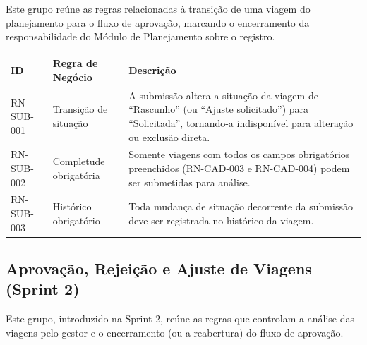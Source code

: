 \documentclass[12pt,article,oneside,a4paper]{abntex2}
\begin{document}
Este grupo reúne as regras relacionadas à transição de uma viagem do
planejamento para o fluxo de aprovação, marcando o encerramento da
responsabilidade do Módulo de Planejamento sobre o registro.

\begin{xltabular}{\textwidth}{|l|l|Y|}
\hline
{}
\textbf{ID} & \textbf{Regra de Negócio} & \textbf{Descrição} \\
\hline
\endhead
RN-SUB-001 & Transição de situação & A submissão altera a situação da viagem de ``Rascunho'' (ou ``Ajuste solicitado'') para ``Solicitada'', tornando-a indisponível para alteração ou exclusão direta. \\
\hline
RN-SUB-002 & Completude obrigatória & Somente viagens com todos os campos obrigatórios preenchidos (RN-CAD-003 e RN-CAD-004) podem ser submetidas para análise. \\
\hline
RN-SUB-003 & Histórico obrigatório & Toda mudança de situação decorrente da submissão deve ser registrada no histórico da viagem. \\
\hline
\end{xltabular}

\bigskip

\subsection{Aprovação, Rejeição e Ajuste de Viagens (Sprint 2)}

Este grupo, introduzido na Sprint 2, reúne as regras que controlam a análise
das viagens pelo gestor e o encerramento (ou a reabertura) do fluxo de
aprovação.
\end{document}
